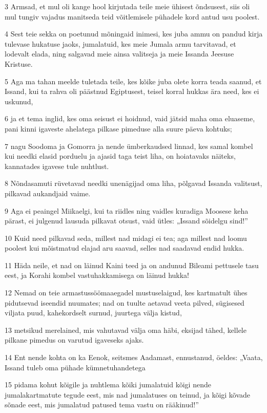 \par 3 Armsad, et mul oli kange hool kirjutada teile meie ühisest õndsusest, siis oli mul tungiv vajadus manitseda teid võitlemisele pühadele kord antud usu poolest.
\par 4 Sest teie sekka on poetunud mõningaid inimesi, kes juba ammu on pandud kirja tulevase hukatuse jaoks, jumalatuid, kes meie Jumala armu tarvitavad, et lodevalt elada, ning salgavad meie ainsa valitseja ja meie Issanda Jeesuse Kristuse.
\par 5 Aga ma tahan meelde tuletada teile, kes kõike juba olete korra teada saanud, et Issand, kui ta rahva oli päästnud Egiptusest, teisel korral hukkas ära need, kes ei uskunud,
\par 6 ja et tema inglid, kes oma seisust ei hoidnud, vaid jätsid maha oma eluaseme, pani kinni igaveste ahelatega pilkase pimeduse alla suure päeva kohtuks;
\par 7 nagu Soodoma ja Gomorra ja nende ümberkaudsed linnad, kes samal kombel kui needki elasid porduelu ja ajasid taga teist liha, on hoiatavaks näiteks, kannatades igavese tule nuhtlust.
\par 8 Nõndasamuti rüvetavad needki unenägijad oma liha, põlgavad Issanda valitsust, pilkavad aukandjaid vaime.
\par 9 Aga ei peaingel Miikaelgi, kui ta riidles ning vaidles kuradiga Moosese keha pärast, ei julgenud lausuda pilkavat otsust, vaid ütles: „Issand sõidelgu sind!”
\par 10 Kuid need pilkavad seda, millest nad midagi ei tea; aga millest nad loomu poolest kui mõistmatud elajad aru saavad, selles nad saadavad endid hukka.
\par 11 Häda neile, et nad on läinud Kaini teed ja on andunud Bileami pettusele tasu eest, ja Korahi kombel vastuhakkamisega on läinud hukka!
\par 12 Nemad on teie armastussöömaaegadel mustuselaigud, kes kartmatult ühes pidutsevad iseendid nuumates; nad on tuulte aetavad veeta pilved, sügisesed viljata puud, kahekordselt surnud, juurtega välja kistud,
\par 13 metsikud merelained, mis vahutavad välja oma häbi, eksijad tähed, kellele pilkane pimedus on varutud igaveseks ajaks.
\par 14 Ent nende kohta on ka Eenok, seitsmes Aadamast, ennustanud, öeldes: „Vaata, Issand tuleb oma pühade kümnetuhandetega
\par 15 pidama kohut kõigile ja nuhtlema kõiki jumalatuid kõigi nende jumalakartmatute tegude eest, mis nad jumalatuses on teinud, ja kõigi kõvade sõnade eest, mis jumalatud patused tema vastu on rääkinud!”
